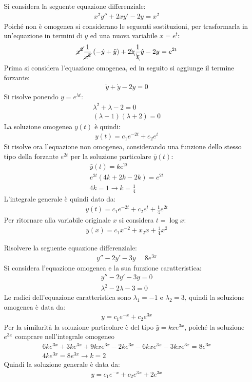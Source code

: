 \documentclass{article}
\numberwithin{equation}{subsection}
\begin{document}
Si considera la seguente equazione differenziale:
\begin{gather*}
    x^2y''+2xy'-2y=x^2
\end{gather*}
Poiché non è omogenea si considerano le seguenti sostituzioni, per trasformarla in un'equazione in termini di $y$ ed una nuova variabile $x=e^t$:
\begin{gather*}
    \cancel{x^2}\frac{1}{\cancel{x^2}}\left(-\dot y+\ddot y\right)+2\bcancel{x}\frac{1}{\bcancel{x}}\dot y-2y=e^{2t}
\end{gather*}
Prima si considera l'equazione omogenea, ed in seguito si aggiunge il termine forzante:
\begin{gather*}
    \ddot y+\dot y-2y=0
\end{gather*}
Si risolve ponendo $y=e^{\lambda t}$:
\begin{gather*}
    \lambda^2 +\lambda-2=0\\
    (\lambda-1)(\lambda+2)=0
\end{gather*}
La soluzione omogenea $y(t)$ è quindi:
\begin{gather*}
    y(t)=c_1e^{-2t}+c_2e^{t}
\end{gather*}
Si risolve ora l'equazione non omogenea, considerando una funzione dello stesso tipo della forzante $e^{2t}$ per la soluzione particolare $\bar y(t)$:
\begin{gather*}
    \bar{y}(t)=ke^{2t}\\
    e^{2t}\left(4k+2k-2k\right)=e^{2t}\\
    4k=1\to k=\frac{1}{4}
\end{gather*}
L'integrale generale è quindi dato da:
\begin{gather*}
    y(t)=c_1e^{-2t}+c_2e^{t}+\frac{1}{4}e^{2t}
\end{gather*}
Per ritornare alla variabile originale $x$ si considera $t=\log x$:
\begin{gather*}
    y(x)=c_1x^{-2}+x_2x+\frac{1}{4}x^2
\end{gather*}

Risolvere la seguente equazione differenziale:
\begin{gather*}
    y''-2y'-3y=8e^{3x}
\end{gather*}
Si considera l'equazione omogenea e la sua funzione caratteristica:
\begin{gather*}
    y''-2y'-3y=0\\
    \lambda^2-2\lambda-3=0
\end{gather*}
Le radici dell'equazione caratteristica sono $\lambda_1=-1$ e $\lambda_2=3$, quindi la soluzione omogenea è data da:
\begin{gather*}
    y=c_1e^{-x}+c_2e^{3x}
\end{gather*}
Per la similarità la soluzione particolare è del tipo $\bar{y}=kxe^{3x}$, poiché la soluzione $e^{3x}$ comprare nell'integrale omogeneo
\begin{gather*}
    6ke^{3x}+3ke^{3x}+9kxe^{3x}-2ke^{3x}-6kxe^{3x}-3kxe^{3x}=8e^{3x}\\
    4ke^{3x}=8e^{3x}\to k=2
\end{gather*}
Quindi la soluzione generale è data da:
\begin{gather*}
    y=c_1e^{-x}+c_2e^{3x}+2e^{3x}
\end{gather*}
\end{document}
